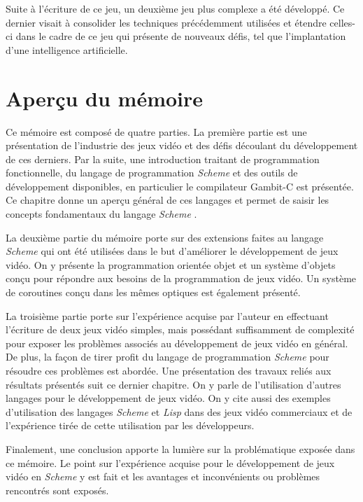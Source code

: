 \documentclass[12pt,twoside,letterpaper,francais]{book}
\newcommand{\lisp}{{\textit{Lisp }}}
\newcommand{\Schemelang}{{\textit{Scheme }}}
\begin{document}
Suite à l'écriture de ce jeu, un deuxième jeu plus complexe a été
développé. Ce dernier visait à consolider les techniques précédemment
utilisées et étendre celles-ci dans le cadre de ce jeu qui présente de
nouveaux défis, tel que l'implantation d'une intelligence
artificielle.


\FloatBarrier
\section{Aperçu du mémoire}
Ce mémoire est composé de quatre parties. La première partie est une
présentation de l'industrie des jeux vidéo et des défis découlant du
développement de ces derniers. Par la suite, une introduction traitant
de programmation fonctionnelle, du langage de programmation
\Schemelang et des outils de développement disponibles, en particulier
le compilateur Gambit-C est présentée. Ce chapitre donne un aperçu
général de ces langages et permet de saisir les concepts fondamentaux
du langage \Schemelang.

La deuxième partie du mémoire porte sur des extensions faites au
langage \Schemelang qui ont été utilisées dans le but d'améliorer le
développement de jeux vidéo. On y présente la programmation orientée
objet et un système d'objets conçu pour répondre aux besoins de la
programmation de jeux vidéo. Un système de coroutines conçu dans les
mêmes optiques est également présenté.

La troisième partie porte sur l'expérience acquise par l'auteur en
effectuant l'écriture de deux jeux vidéo simples, mais possédant
suffisamment de complexité pour exposer les problèmes associés au
développement de jeux vidéo en général. De plus, la façon de tirer
profit du langage de programmation \Schemelang pour résoudre ces
problèmes est abordée. Une présentation des travaux reliés aux
résultats présentés suit ce dernier chapitre. On y parle de
l'utilisation d'autres langages pour le développement de jeux
vidéo. On y cite aussi des exemples d'utilisation des langages
\Schemelang et \lisp dans des jeux vidéo commerciaux et de
l'expérience tirée de cette utilisation par les développeurs.

Finalement, une conclusion apporte la lumière sur la problématique
exposée dans ce mémoire. Le point sur l'expérience acquise pour le
développement de jeux vidéo en \Schemelang y est fait et les avantages
et inconvénients ou problèmes rencontrés sont exposés.


\clearpage

\end{document}
